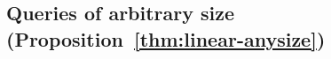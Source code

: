 \subsection{Queries of arbitrary size
  (Proposition~\ref{thm:linear-anysize})}
\label{app:hardness-anysize}

